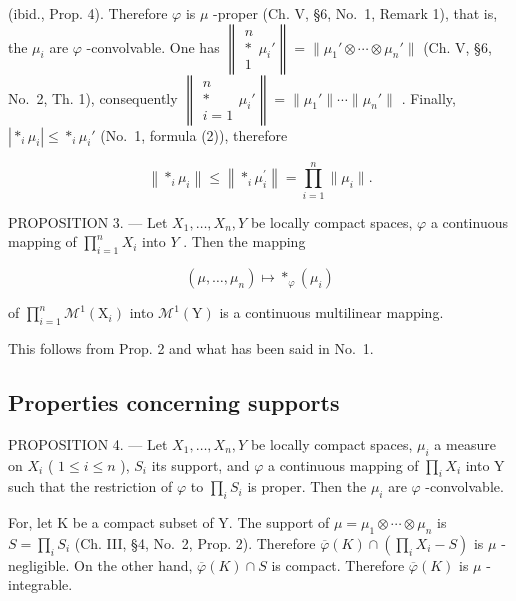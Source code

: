 (ibid., Prop. 4). Therefore \(\varphi\) is \(\mu\) -proper (Ch. V, §6, No.~1, Remark 1), that is, the \(\mu_i\) are \(\varphi\) -convolvable. One has \(\left\| \begin{array}{c} n \\ * \\ 1 \end{array} \mu_i'\right\| = \| \mu_1' \otimes \cdots \otimes \mu_n'\|\) (Ch. V, §6, No.~2, Th. 1), consequently \(\left\| \begin{array}{c} n \\ * \\ i=1 \end{array} \mu_i'\right\| = \| \mu_1'\| \cdots \| \mu_n'\|\) . Finally, \(| *_{i} \mu_i| \leqslant *_{i} \mu_i'\) (No.~1, formula (2)), therefore

\[
\left\| \ast_ {i} \mu_ {i} \right\| \leqslant \left\| \ast_ {i} \mu_ {i} ^ {\prime} \right\| = \prod_ {i = 1} ^ {n} \| \mu_ {i} \|.
\]

PROPOSITION 3. --- Let \(X_1, \ldots, X_n, Y\) be locally compact spaces, \(\varphi\) a continuous mapping of \(\prod_{i=1}^{n} X_i\) into \(Y\) . Then the mapping

\[
(\mu , \dots , \mu_ {n}) \mapsto * _ {\varphi} (\mu_ {i})
\]

of \(\prod_{i=1}^{n} \mathcal{M}^1(\mathrm{X}_i)\) into \(\mathcal{M}^1(\mathrm{Y})\) is a continuous multilinear mapping.

This follows from Prop. 2 and what has been said in No.~1.

\subsection{Properties concerning supports}

PROPOSITION 4. --- Let \(X_{1},\ldots,X_{n},Y\) be locally compact spaces, \(\mu_{i}\) a measure on \(X_{i}\) ( \(1\leqslant i\leqslant n\) ), \(S_{i}\) its support, and \(\varphi\) a continuous mapping of \(\prod_{i} X_{i}\) into Y such that the restriction of \(\varphi\) to \(\prod_{i} S_{i}\) is proper. Then the \(\mu_{i}\) are \(\varphi\) -convolvable.

For, let K be a compact subset of Y. The support of \(\mu = \mu_{1} \otimes \cdots \otimes \mu_{n}\) is \(S = \prod_{i} S_{i}\) (Ch. III, §4, No.~2, Prop. 2). Therefore \(\overline{\varphi}(K) \cap \left( \prod_{i} X_{i} - S \right)\) is \(\mu\) -negligible. On the other hand, \(\overline{\varphi}(K) \cap S\) is compact. Therefore \(\overline{\varphi}(K)\) is \(\mu\) -integrable.


